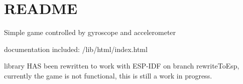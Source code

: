 \chapter{README}
\hypertarget{md__r_e_a_d_m_e}{}\label{md__r_e_a_d_m_e}
Simple game controlled by  gyroscope and accelerometer

documentation included\+: /lib/html/index.html

library HAS been rewritten to work with ESP-\/\+IDF on branch rewrite\+To\+Esp, currently the game is not functional, this is still a work in progress. 